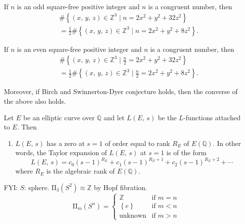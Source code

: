 \begin{theorem}
    If $n$ is an odd square-free positive integer and $n$ is a congruent number, then
    \begin{align*}
        & \#\left\{\left(x,\,y,\,z\right)\in\mathbb{Z}^3\mid n=2x^2+y^2+32z^2\right\}\\
        & = \frac{1}{2}\#\left\{\left(x,\,y,\,z\right)\in\mathbb{Z}^3\mid n=2x^2+y^2+8z^2\right\}.
    \end{align*}

    If $n$ is an even square-free positive integer and $n$ is a congruent number, then
    \begin{align*}
        & \#\left\{\left(x,\,y,\,z\right)\in\mathbb{Z}^3\mid \frac{n}{2}=2x^2+y^2+32z^2\right\}\\
        & = \frac{1}{2}\#\left\{\left(x,\,y,\,z\right)\in\mathbb{Z}^3\mid \frac{n}{2}=2x^2+y^2+8z^2\right\}.
    \end{align*}

    Moreover, if Birch and Swinnerton-Dyer conjecture holds, then the converse of the above also holds.
\end{theorem}

\begin{conjecture}
    Let $E$ be an elliptic curve over $\mathbb{Q}$ and let $L\left(E,\,s\right)$ be the
    $L$-functions attached to $E$. Then
    \begin{enumerate}
        \item $L\left(E,\,s\right)$ has a zero at $s=1$ of order equal to rank $R_E$ of $E\left(\mathbb{Q}\right)$.
        In other words, the Taylor expansion of $L\left(E,\,s\right)$ at $s=1$ is of the form \[
            L\left(E,\,s\right)=c_0\left(s-1\right)^{R_E}+c_1\left(s-1\right)^{R_E+1}+c_2\left(s-1\right)^{R_E+2}+\cdots
        \]
        where $R_E$ is the algebraic rank of $E\left(\mathbb{Q}\right)$.
    \end{enumerate}
\end{conjecture}

FYI: $S$: sphere. $\mathrm{\Pi}_3\left(S^2\right) \approx \mathbb{Z}$ by Hopf fibration.
\[
    \mathrm{\Pi}_{m}\left(S^n\right)= \begin{cases}
        \mathbb{Z} & \mbox{if } m=n \\
        \left\{e\right\} & \mbox{if } m<n \\
        \mbox{unknown} & \mbox{if } m>n
    \end{cases}
\]

